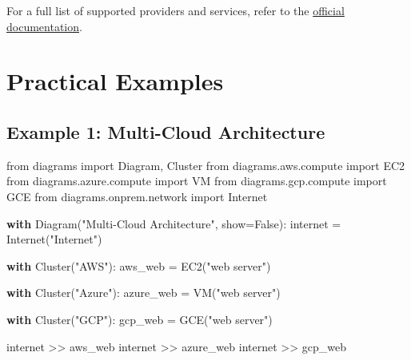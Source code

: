 \documentclass[
  letterpaper,
  DIV=11,
  numbers=noendperiod]{scrreprt}
\newenvironment{Shaded}{\begin{snugshade}}{\end{snugshade}}
\newcommand{\ControlFlowTok}[1]{\textcolor[rgb]{0.00,0.23,0.31}{\textbf{#1}}}
\newcommand{\ImportTok}[1]{\textcolor[rgb]{0.00,0.46,0.62}{#1}}
\newcommand{\NormalTok}[1]{\textcolor[rgb]{0.00,0.23,0.31}{#1}}
\newcommand{\OperatorTok}[1]{\textcolor[rgb]{0.37,0.37,0.37}{#1}}
\newcommand{\StringTok}[1]{\textcolor[rgb]{0.13,0.47,0.30}{#1}}
\newcommand{\VariableTok}[1]{\textcolor[rgb]{0.07,0.07,0.07}{#1}}
\begin{document}
For a full list of supported providers and services, refer to the
\href{https://diagrams.mingrammer.com/docs/nodes}{official
documentation}.

\section{Practical Examples}\label{practical-examples-7}

\subsection{Example 1: Multi-Cloud
Architecture}\label{example-1-multi-cloud-architecture}

\begin{Shaded}
\begin{Highlighting}[]
\ImportTok{from}\NormalTok{ diagrams }\ImportTok{import}\NormalTok{ Diagram, Cluster}
\ImportTok{from}\NormalTok{ diagrams.aws.compute }\ImportTok{import}\NormalTok{ EC2}
\ImportTok{from}\NormalTok{ diagrams.azure.compute }\ImportTok{import}\NormalTok{ VM}
\ImportTok{from}\NormalTok{ diagrams.gcp.compute }\ImportTok{import}\NormalTok{ GCE}
\ImportTok{from}\NormalTok{ diagrams.onprem.network }\ImportTok{import}\NormalTok{ Internet}

\ControlFlowTok{with}\NormalTok{ Diagram(}\StringTok{"Multi{-}Cloud Architecture"}\NormalTok{, show}\OperatorTok{=}\VariableTok{False}\NormalTok{):}
\NormalTok{    internet }\OperatorTok{=}\NormalTok{ Internet(}\StringTok{"Internet"}\NormalTok{)}
    
    \ControlFlowTok{with}\NormalTok{ Cluster(}\StringTok{"AWS"}\NormalTok{):}
\NormalTok{        aws\_web }\OperatorTok{=}\NormalTok{ EC2(}\StringTok{"web server"}\NormalTok{)}
        
    \ControlFlowTok{with}\NormalTok{ Cluster(}\StringTok{"Azure"}\NormalTok{):}
\NormalTok{        azure\_web }\OperatorTok{=}\NormalTok{ VM(}\StringTok{"web server"}\NormalTok{)}
        
    \ControlFlowTok{with}\NormalTok{ Cluster(}\StringTok{"GCP"}\NormalTok{):}
\NormalTok{        gcp\_web }\OperatorTok{=}\NormalTok{ GCE(}\StringTok{"web server"}\NormalTok{)}
        
\NormalTok{    internet }\OperatorTok{\textgreater{}\textgreater{}}\NormalTok{ aws\_web}
\NormalTok{    internet }\OperatorTok{\textgreater{}\textgreater{}}\NormalTok{ azure\_web}
\NormalTok{    internet }\OperatorTok{\textgreater{}\textgreater{}}\NormalTok{ gcp\_web}
\end{Highlighting}
\end{Shaded}
\end{document}
